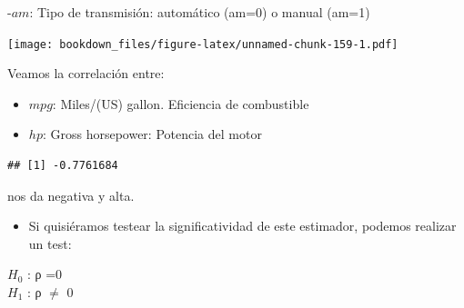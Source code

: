 \documentclass[]{book}
\newenvironment{Shaded}{\begin{snugshade}}{\end{snugshade}}
\newcommand{\DataTypeTok}[1]{\textcolor[rgb]{0.13,0.29,0.53}{#1}}
\newcommand{\KeywordTok}[1]{\textcolor[rgb]{0.13,0.29,0.53}{\textbf{#1}}}
\newcommand{\NormalTok}[1]{#1}
\newcommand{\OperatorTok}[1]{\textcolor[rgb]{0.81,0.36,0.00}{\textbf{#1}}}
\newcommand{\StringTok}[1]{\textcolor[rgb]{0.31,0.60,0.02}{#1}}
\providecommand{\tightlist}{%
  \setlength{\itemsep}{0pt}\setlength{\parskip}{0pt}}
\begin{document}
-\(am\): Tipo de transmisión: automático (am=0) o manual (am=1)

\begin{Shaded}
\end{Shaded}

\texttt{[image: bookdown\_files/figure-latex/unnamed-chunk-159-1.pdf]}

Veamos la correlación entre:

\begin{itemize}
\tightlist
\item
  \(mpg\): Miles/(US) gallon. Eficiencia de combustible
\item
  \(hp\): Gross horsepower: Potencia del motor
\end{itemize}

\begin{Shaded}
\end{Shaded}

\begin{verbatim}
## [1] -0.7761684
\end{verbatim}

nos da negativa y alta.

\begin{itemize}
\tightlist
\item
  Si quisiéramos testear la significatividad de este estimador, podemos realizar un test:
\end{itemize}

\(H_0\) : ρ =0\\
\(H_1\) : ρ \(\neq\) 0

\begin{Shaded}
\end{Shaded}
\end{document}
